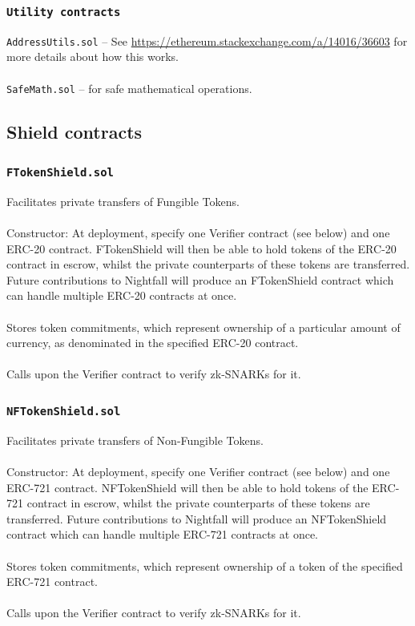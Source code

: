 \documentclass{article}
\begin{document}
\subsubsection{\texttt{Utility contracts}}

\texttt{AddressUtils.sol} -- See \url{https://ethereum.stackexchange.com/a/14016/36603} for more details about how this works.\\
\\
\texttt{SafeMath.sol} -- for safe mathematical operations.


\subsection{Shield contracts}
\subsubsection{\texttt{FTokenShield.sol}}
Facilitates private transfers of Fungible Tokens.\\
\\
Constructor: At deployment, specify one Verifier contract (see below) and one ERC-20 contract. FTokenShield will then be able to hold tokens of the ERC-20 contract in escrow, whilst the private counterparts of these tokens are transferred. Future contributions to Nightfall will produce an FTokenShield contract which can handle multiple ERC-20 contracts at once.\\
\\
Stores token commitments, which represent ownership of a particular amount of currency, as denominated in the specified ERC-20 contract.\\
\\
Calls upon the Verifier contract to verify zk-SNARKs for it.

\subsubsection{\texttt{NFTokenShield.sol}}
Facilitates private transfers of Non-Fungible Tokens.\\
\\
Constructor: At deployment, specify one Verifier contract (see below) and one ERC-721 contract. NFTokenShield will then be able to hold tokens of the ERC-721 contract in escrow, whilst the private counterparts of these tokens are transferred. Future contributions to Nightfall will produce an NFTokenShield contract which can handle multiple ERC-721 contracts at once.\\
\\
Stores token commitments, which represent ownership of a token of the specified ERC-721 contract.\\
\\
Calls upon the Verifier contract to verify zk-SNARKs for it.
\end{document}
